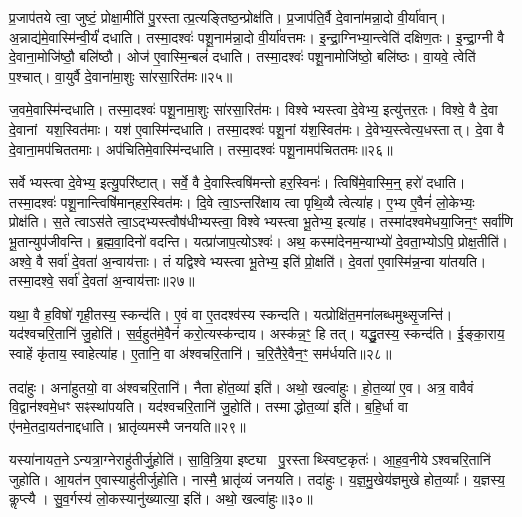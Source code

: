 प्र॒जाप॑तये त्वा॒ जुष्टं॒ प्रोक्षा॒मीति॑ पु॒रस्तात्प्र॒त्यङ्तिष्ठ॒न्प्रोक्ष॑ति।
प्र॒जाप॑ति॒र्वै दे॒वाना॑मन्ना॒दो वी॒र्या॑वान्।
अ॒न्नाद्य॑मे॒वास्मि॑न्वी॒र्यं॑ दधाति।
तस्मा॒दश्वः॑ पशू॒नाम॑न्ना॒दो वी॒र्या॑वत्तमः।
इ॒न्द्रा॒ग्निभ्या॒न्त्वेति॑ दक्षिण॒तः।
इ॒न्द्रा॒ग्नी वै दे॒वाना॒मोजि॑ष्ठौ॒ बलि॑ष्ठौ।
ओज॑ ए॒वास्मि॒न्बलं॑ दधाति।
तस्मा॒दश्वः॑ पशू॒नामोजि॑ष्ठो॒ बलि॑ष्ठः।
वा॒यवे॒ त्वेति॑ प॒श्चात्।
वा॒युर्वै दे॒वाना॑मा॒शुः सा॑रसा॒रित॑मः॥२५॥

ज॒वमे॒वास्मि॑न्दधाति।
तस्मा॒दश्वः॑ पशू॒नामा॒शुः सा॑रसा॒रित॑मः।
विश्वेभ्यस्त्वा दे॒वेभ्य॒ इत्यु॑त्तर॒तः।
विश्वे॒ वै दे॒वा दे॒वानां यश॒स्वित॑माः।
यश॑ ए॒वास्मि॑न्दधाति।
तस्मा॒दश्वः॑ पशू॒नां य॑श॒स्वित॑मः।
दे॒वेभ्य॒स्त्वेत्य॒धस्तात्।
दे॒वा वै दे॒वाना॒मप॑चिततमाः।
अप॑चितिमे॒वास्मि॑न्दधाति।
तस्मा॒दश्वः॑ पशू॒नामप॑चिततमः॥२६॥

सर्वेभ्यस्त्वा दे॒वेभ्य॒ इत्यु॒परि॑ष्टात्।
सर्वे॒ वै दे॒वास्त्विषि॑मन्तो हर॒स्विनः॑।
त्विषि॑मे॒वास्मि॒न्॒ हरो॑ दधाति।
तस्मा॒दश्वः॑ पशू॒नान्त्विषि॑मान्‌हर॒स्वित॑मः।
दि॒वे त्वा॒\-ऽन्तरि॑क्षाय त्वा पृथि॒व्यै त्वेत्या॑ह।
ए॒भ्य ए॒वैनं॑ लो॒केभ्यः॒ प्रोक्ष॑ति।
स॒ते त्वा\-ऽस॑ते त्वा॒\-ऽद्भ्यस्त्वौष॑धीभ्यस्त्वा॒ विश्वेभ्यस्त्वा भू॒तेभ्य॒ इत्या॑ह।
तस्मा॑दश्वमेधया॒जिन॒ꣳ॒ सर्वा॑णि भू॒तान्युप॑जीवन्ति।
ब्र॒ह्म॒वा॒दिनो॑ वदन्ति।
यत्प्रा॑जाप॒त्यो\-ऽश्वः॑।
अथ॒ कस्मा॑देनम॒न्याभ्यो॑ दे॒वता॒भ्योऽपि॒ प्रोक्ष॒तीति॑।
अश्वे॒ वै सर्वा॑ दे॒वता॑ अ॒न्वाय॑त्ताः।
तं यद्विश्वेभ्यस्त्वा भू॒तेभ्य॒ इति॑ प्रो॒क्षति॑।
दे॒वता॑ ए॒वास्मि॑न्न॒न्वा या॑तयति।
तस्मा॒दश्वे॒ सर्वा॑ दे॒वता॑ अ॒न्वाय॑त्ताः॥२७॥\anuvakamend[सा॒र॒सा॒रित॒मो\-ऽप॑चिततमः प्राजाप॒त्यो\-ऽश्वः॒ पञ्च॑ च]

यथा॒ वै ह॒विषो॑ गृही॒तस्य॒ स्कन्द॑ति।
ए॒वं वा ए॒तदश्व॑स्य स्कन्दति।
यत्प्रोक्षि॑त॒मना॑लब्धमुथ्सृ॒जन्ति॑।
यद॑श्वचरि॒तानि॑ जु॒होति॑।
स॒र्व॒हुत॑मे॒वैनं॑ करो॒त्यस्क॑न्दाय।
अस्क॑न्न॒ꣳ॒ हि तत्।
यद्धु॒तस्य॒ स्कन्द॑ति।
ई॒ङ्का॒राय॒ स्वाहें कृ॑ताय॒ स्वाहेत्या॑ह।
ए॒तानि॒ वा अ॑श्वचरि॒तानि॑।
च॒रि॒तैरे॒वैन॒ꣳ॒ सम॑र्धयति॥२८॥

तदा॑हुः।
अना॑हुतयो॒ वा अ॑श्वचरि॒तानि॑।
नैता हो॑त॒व्या॑ इति॑।
अथो॒ खल्वा॑हुः।
हो॒त॒व्या॑ ए॒व।
अत्र॒ वावैवं वि॒द्वान॑श्वमे॒धꣳ सꣴस्था॑पयति।
यद॑श्वचरि॒तानि॑ जु॒होति॑।
तस्माद्धोत॒व्या॑ इति॑।
ब॒हि॒र्धा वा ए॑नमे॒तदा॒यत॑नाद्दधाति।
भ्रातृ॑व्यमस्मै जनयति॥२९॥

यस्या॑नायत॒ने\-ऽन्यत्रा॒ग्नेराहु॑तीर्जु॒होति॑।
सा॒वि॒त्रि॒या इष्ट्या पु॒रस्ताथ्स्विष्ट॒कृतः॑।
आ॒ह॒व॒नीये\-ऽश्वचरि॒तानि॑ जुहोति।
आ॒यत॑न ए॒वास्याहु॑तीर्जुहोति।
नास्मै॒ भ्रातृ॑व्यं जनयति।
तदा॑हुः।
य॒ज्ञ॒मु॒खेय॑ज्ञमुखे होत॒व्याः᳚।
य॒ज्ञस्य॒ कॢप्त्यै।
सु॒व॒र्गस्य॑ लो॒कस्यानु॑ख्यात्या॒ इति॑।
अथो॒ खल्वा॑हुः॥३०॥

